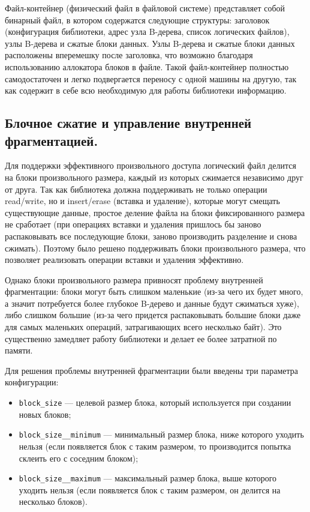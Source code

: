 Файл-контейнер (физический файл в файловой системе) представляет собой бинарный файл, в котором содержатся следующие структуры: заголовок (конфигурация библиотеки, адрес узла B-дерева, список логических файлов), узлы B-дерева и сжатые блоки данных. Узлы B-дерева и сжатые блоки данных расположены вперемешку после заголовка, что возможно благодаря использованию аллокатора блоков в файле. Такой файл-контейнер полностью самодостаточен и легко подвергается переносу с одной машины на другую, так как содержит в себе всю необходимую для работы библиотеки информацию.

\subsection{Блочное сжатие и управление внутренней фрагментацией.} \label{internal-fragmentation}

Для поддержки эффективного произвольного доступа логический файл делится на блоки произвольного размера, каждый из которых сжимается независимо друг от друга. Так как библиотека должна поддерживать не только операции read/write, но и insert/erase (вставка и удаление), которые могут смещать существующие данные, простое деление файла на блоки фиксированного размера не сработает (при операциях вставки и удаления пришлось бы заново распаковывать все последующие блоки, заново производить разделение и снова сжимать). Поэтому было решено поддерживать блоки произвольного размера, что позволяет реализовать операции вставки и удаления эффективно.

Однако блоки произвольного размера привносят проблему внутренней фрагментации: блоки могут быть слишком маленькие (из-за чего их будет много, а значит потребуется более глубокое B-дерево и данные будут сжиматься хуже), либо слишком большие (из-за чего придется распаковывать большие блоки даже для самых маленьких операций, затрагивающих всего несколько байт). Это существенно замедляет работу библиотеки и делает ее более затратной по памяти.

Для решения проблемы внутренней фрагментации были введены три параметра конфигурации: 
\begin{itemize}
    \item \texttt{block\_size} --- целевой размер блока, который используется при создании новых блоков;
    \item \texttt{block\_size\_\_minimum} --- минимальный размер блока, ниже которого уходить нельзя (если появляется блок с таким размером, то производится попытка склеить его с соседним блоком);
    \item \texttt{block\_size\_\_maximum} --- максимальный размер блока, выше которого уходить нельзя (если появляется блок с таким размером, он делится на несколько блоков).
\end{itemize}

